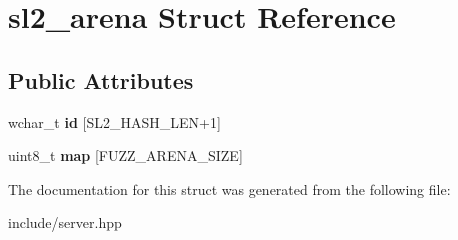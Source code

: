 \hypertarget{structsl2__arena}{}\section{sl2\+\_\+arena Struct Reference}
\label{structsl2__arena}
\subsection*{Public Attributes}
\begin{DoxyCompactItemize}
\item 
\mbox{\label{structsl2__arena_a0ab4fe023aa90586704e30c8204b12b9}} 
wchar\+\_\+t {\bfseries id} \mbox{[}S\+L2\+\_\+\+H\+A\+S\+H\+\_\+\+L\+EN+1\mbox{]}
\item 
\mbox{\label{structsl2__arena_aec69aefd7023e28ad1cadaa13c2cf06f}} 
uint8\+\_\+t {\bfseries map} \mbox{[}F\+U\+Z\+Z\+\_\+\+A\+R\+E\+N\+A\+\_\+\+S\+I\+ZE\mbox{]}
\end{DoxyCompactItemize}


The documentation for this struct was generated from the following file\+:\begin{DoxyCompactItemize}
\item 
include/server.\+hpp\end{DoxyCompactItemize}
